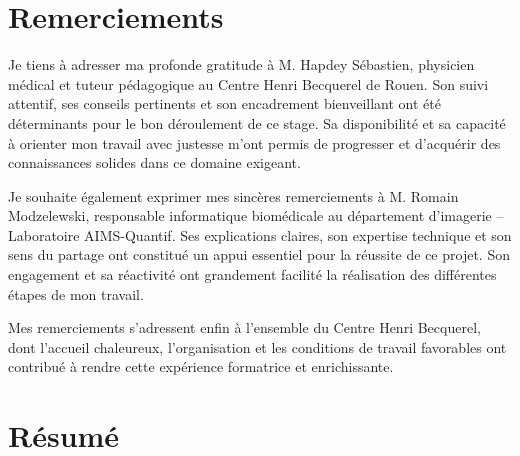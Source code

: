 \documentclass[11pt,a4paper]{report}
\begin{document}


\chapter*{Remerciements}

Je tiens à adresser ma profonde gratitude à M. Hapdey Sébastien, physicien médical et tuteur pédagogique au Centre Henri Becquerel de Rouen. Son suivi attentif, ses conseils pertinents et son encadrement bienveillant ont été déterminants pour le bon déroulement de ce stage. Sa disponibilité et sa capacité à orienter mon travail avec justesse m'ont permis de progresser et d'acquérir des connaissances solides dans ce domaine exigeant.

Je souhaite également exprimer mes sincères remerciements à M. Romain Modzelewski, responsable informatique biomédicale au département d'imagerie – Laboratoire AIMS-Quantif. Ses explications claires, son expertise technique et son sens du partage ont constitué un appui essentiel pour la réussite de ce projet. Son engagement et sa réactivité ont grandement facilité la réalisation des différentes étapes de mon travail.

Mes remerciements s'adressent enfin à l'ensemble du Centre Henri Becquerel, dont l'accueil chaleureux, l'organisation et les conditions de travail favorables ont contribué à rendre cette expérience formatrice et enrichissante.

\newpage

\chapter*{Résumé}
\end{document}
